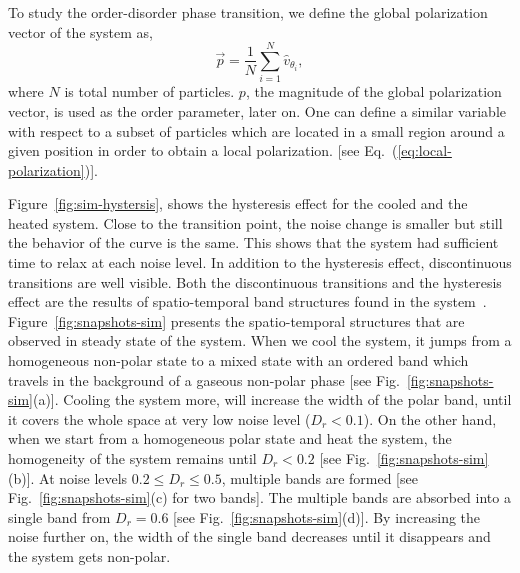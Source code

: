 \documentclass[reprint,floatfix,amsmath,amssymb,aps,pre,showkeys,showpacs,superscriptaddress]{revtex4-1}
\newcommand{\p}{p}
\newcommand{\vp}{\vec{\p}}
\newcommand{\hl}[1]{\textcolor{hlcolor}{#1}}
\newcommand{\req}[1]{Eq.~(\ref{#1})}
\begin{document}
To study the order-disorder phase transition, we define the global polarization vector of the system as,
\begin{equation}
\vp = \frac{1}{N} \sum_{i=1}^N \hat{v}_{\theta_i},
\label{eq:polarization}
\end{equation}
where $N$ is total number of particles. $\p$, the magnitude of the global polarization vector, is used as the order parameter, later on. \hl{One can define a similar variable with respect to a subset of particles which are located in a small region around a given position in order to obtain a local polarization.} \hl{[see \req{eq:local-polarization}]}.

Figure~\ref{fig:sim-hystersis}, shows the hysteresis effect for the cooled and the heated system. \hl{Close to the transition point, the noise change is smaller but still the behavior of the curve is the same. This shows that the system had sufficient time to relax at each noise level.} In addition to the hysteresis effect, discontinuous transitions are well visible. Both the discontinuous transitions and the hysteresis effect are the results of spatio-temporal band structures found in the system~\cite{Gregoire2004,nagy2007,Chate2008,Chate2008a,Ihle2013invasion,solon2015from,solon2015flocking,solon2015pattern,thuroff2014numerical}. Figure~\ref{fig:snapshots-sim} presents the spatio-temporal structures that are observed in \hl{steady state of} the system. When we cool the system, it jumps from a homogeneous non-polar state to a mixed state with an ordered band which travels in the background of a gaseous non-polar phase [see Fig.~\ref{fig:snapshots-sim}(a)]. Cooling the system more, will increase the width of the polar band, until it covers the whole space at very low noise level ($D_r < 0.1$). On the other hand, when we start from a homogeneous polar state and heat the system, the homogeneity of the system remains until $D_r<0.2$ [see Fig.~\ref{fig:snapshots-sim}(b)]. At noise levels \hl{$0.2 \leq D_r \leq 0.5$}, multiple bands are formed [see Fig.~\ref{fig:snapshots-sim}(c) for two bands]. The multiple bands are absorbed into a single band from $D_r=0.6$ [see Fig.~\ref{fig:snapshots-sim}(d)]. By increasing the noise further \hl{on}, the width of the single band decreases until it disappears and the system gets non-polar.
\end{document}
